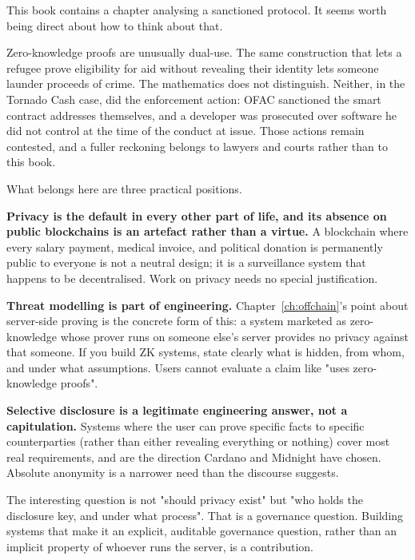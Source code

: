 This book contains a chapter analysing a sanctioned protocol. It seems worth
being direct about how to think about that.

Zero-knowledge proofs are unusually dual-use. The same construction that lets a
refugee prove eligibility for aid without revealing their identity lets someone
launder proceeds of crime. The mathematics does not distinguish. Neither, in the
Tornado Cash case, did the enforcement action: OFAC sanctioned the smart
contract addresses themselves, and a developer was prosecuted over software he
did not control at the time of the conduct at issue. Those actions remain
contested, and a fuller reckoning belongs to lawyers and courts rather than to
this book.

What belongs here are three practical positions.

\textbf{Privacy is the default in every other part of life, and its absence on
public blockchains is an artefact rather than a virtue.} A blockchain where
every salary payment, medical invoice, and political donation is permanently
public to everyone is not a neutral design; it is a surveillance system that
happens to be decentralised. Work on privacy needs no special justification.

\textbf{Threat modelling is part of engineering.} Chapter~\ref{ch:offchain}'s
point about server-side proving is the concrete form of this: a system marketed
as zero-knowledge whose prover runs on someone else's server provides no privacy
against that someone. If you build ZK systems, state clearly what is hidden,
from whom, and under what assumptions. Users cannot evaluate a claim like "uses
zero-knowledge proofs".

\textbf{Selective disclosure is a legitimate engineering answer, not a
capitulation.} Systems where the user can prove specific facts to specific
counterparties (rather than either revealing everything or nothing) cover
most real requirements, and are the direction Cardano and Midnight have chosen.
Absolute anonymity is a narrower need than the discourse suggests.

\begin{highlight}
The interesting question is not "should privacy exist" but "who holds the
disclosure key, and under what process". That is a governance question. Building
systems that make it an explicit, auditable governance question, rather than
an implicit property of whoever runs the server, is a contribution.
\end{highlight}

